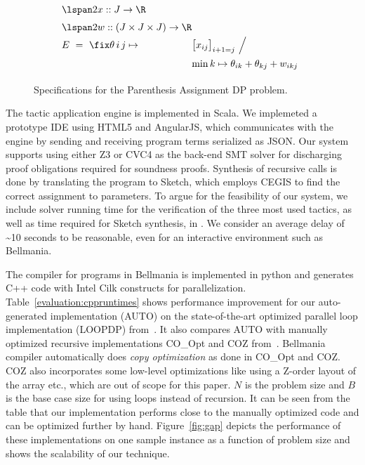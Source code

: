 \begin{figure}
\[
  \renewcommand\arraystretch{1.5}
  \begin{array}{@{}l@{}l}
    \lspan2{x :: J\to\R} \\
    \lspan2{w :: (J\times J\times J)\to\R} \\
    E ~=~ \fix \theta\,i\,j\mapsto{}
      & {\big[x_{ij}\big]_{i+1=j} ~\Big/~} \\
      & \min k\mapsto\theta_{ik}+\theta_{kj}+w_{ikj} \\
  \end{array}
\]
\caption{\label{evaluation:paren spec}
  Specifications for the Parenthesis Assignment DP problem.}
\end{figure}


The tactic application engine is implemented in Scala. We implemeted a prototype
IDE using HTML5 and AngularJS, which communicates with the engine by sending
and receiving program terms serialized as JSON. Our system supports using either
Z3 or CVC4 as the back-end SMT solver for discharging proof obligations required
for soundness proofs. Synthesis of recursive calls is done by translating the
program to Sketch, which employs CEGIS to find the correct assignment to parameters.
To argue for the feasibility of our system, we include
solver running time for the verification of the three most used tactics,
as well as time required for Sketch synthesis, in .
We consider an average delay of \textasciitilde 10 seconds to be reasonable, even for an interactive
environment such as Bellmania. 

The compiler for programs in Bellmania is implemented in 
python and generates C++ code with Intel Cilk constructs for parallelization.
Table~\ref{evaluation:cppruntimes} shows performance improvement for our 
auto-generated implementation (AUTO) on the state-of-the-art optimized parallel
loop implementation (LOOPDP) from~\cite{IPDPS15/Tithi}. It also compares AUTO with manually 
optimized recursive implementations CO\_Opt and COZ from~\cite{IPDPS15/Tithi}. 
Bellmania compiler automatically does \textit{copy optimization} 
as done in CO\_Opt and COZ. COZ also incorporates some low-level 
optimizations like using a Z-order layout of the array etc.,
which are out of scope for this paper. %
$N$ is the problem size and $B$ is the base case size for using loops 
instead of recursion. It can be seen from the table that our implementation 
performs close to the manually optimized code and can be optimized further by 
hand. Figure~\ref{fig:gap} depicts the performance of these implementations 
on one sample instance
as a function of problem size and shows the scalability of our technique. %


